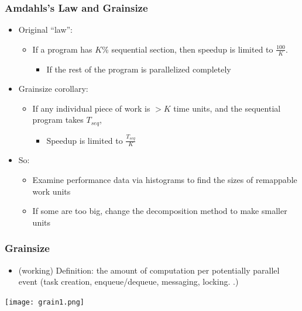 \documentclass{beamer}
\begin{document}
\begin{frame}
  \frametitle{Amdahls’s Law and Grainsize}
  \begin{itemize}
    \item Original ``law'':
      \begin{itemize}
      \item If a program has $K$\% sequential section, then speedup is limited
        to $\frac{100}{K}$.
        \begin{itemize}
        \item If the rest of the program is parallelized completely
        \end{itemize}
      \end{itemize}
    \item Grainsize corollary:
      \begin{itemize}
      \item If any individual piece of work is $> K$ time units, and the
        sequential program takes $T_{seq}$, 
        \begin{itemize}
        \item Speedup is limited to $\frac{T_{seq}}{K}$
        \end{itemize}
      \end{itemize}
    \item So:
      \begin{itemize}
      \item Examine performance data via histograms to find the sizes of
        remappable work units
      \item If some are too big, change the decomposition method to make
        smaller units
      \end{itemize}
  \end{itemize}
\end{frame}

\begin{frame}
  \frametitle{Grainsize}
  \begin{itemize}
    \item (working) Definition: the amount of computation per potentially
      parallel event (task creation, enqueue/dequeue, messaging, locking. .)
  \end{itemize}
  \begin{center} \texttt{[image: grain1.png]} \end{center}
\end{frame}
\end{document}
